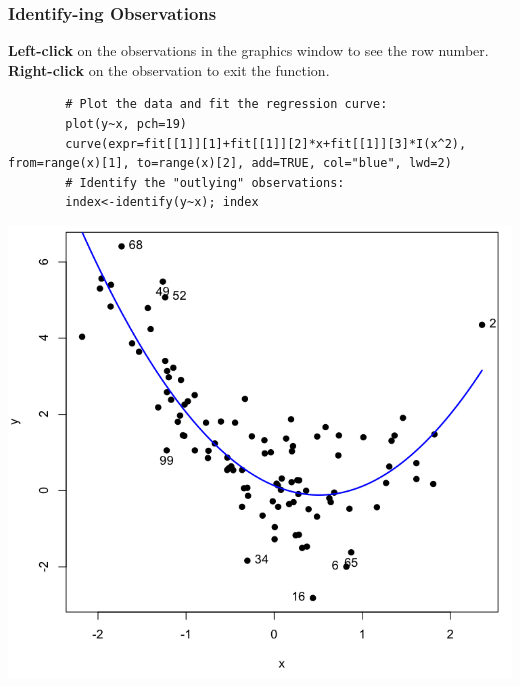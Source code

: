 \begin{frame}
\frametitle{\ttfamily Identify\normalfont-ing Observations}
\textbf{Left-click} \normalfont on the observations in the graphics window to see the row number. \\
\noindent \textbf{Right-click} \normalfont on the observation to exit the function.
	\begin{lstlisting}
		# Plot the data and fit the regression curve:
		plot(y~x, pch=19)
		curve(expr=fit[[1]][1]+fit[[1]][2]*x+fit[[1]][3]*I(x^2), from=range(x)[1], to=range(x)[2], add=TRUE, col="blue", lwd=2)
		# Identify the "outlying" observations:
		index<-identify(y~x); index		
	\end{lstlisting}

\newpage
\begin{center}
\includegraphics[scale=0.27]{images/xyPlotInd.png}
\end{center}

\end{frame}




